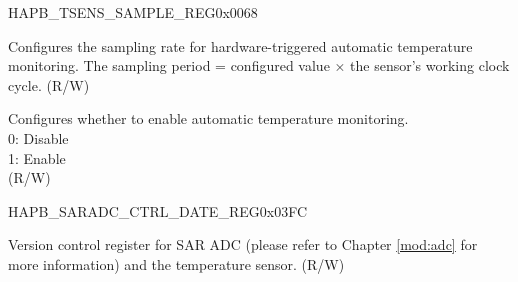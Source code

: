 \begin{register}{H}{APB\_TSENS\_SAMPLE\_REG}{0x0068}\label{regdesc:APBTSENSSAMPLEREG}
%
%
%
\regnewline%
\begin{regdesc}\begin{reglist}
\label{fielddesc:APBSARADCTSENSSAMPLERATE}\item [APB\_SARADC\_TSENS\_SAMPLE\_RATE] Configures the sampling rate for hardware-triggered automatic temperature monitoring. The sampling period = configured value × the sensor's working clock cycle. (R/W)
\label{fielddesc:APBSARADCTSENSSAMPLEEN}\item [APB\_SARADC\_TSENS\_SAMPLE\_EN] Configures whether to enable automatic temperature monitoring. \\
0: Disable\\
1: Enable\\
(R/W)
\end{reglist}\end{regdesc}
\end{register}


\begin{register}{H}{APB\_SARADC\_CTRL\_DATE\_REG}{0x03FC}\label{regdesc:APBSARADCCTRLDATEREG}
%
\regnewline%
\begin{regdesc}\begin{reglist}
\label{fielddesc:APBSARADCDATE}\item [APB\_SARADC\_DATE] Version control register for SAR ADC (please refer to Chapter \ref{mod:adc} \textit{} for more information) and the temperature sensor. (R/W)
\end{reglist}\end{regdesc}
\end{register}
